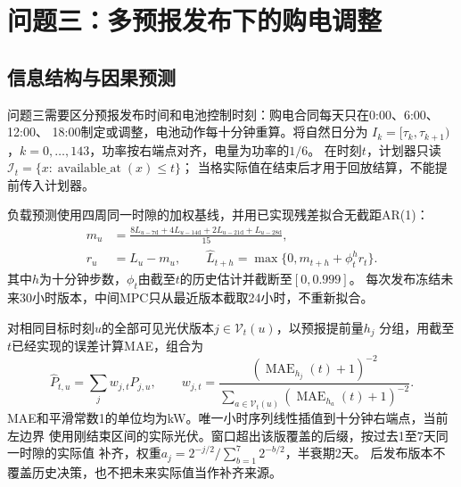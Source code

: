 \section{问题三：多预报发布下的购电调整}

\subsection{信息结构与因果预测}
问题三需要区分预报发布时间和电池控制时刻：购电合同每天只在0:00、6:00、12:00、
18:00制定或调整，电池动作每十分钟重算。将自然日分为
$I_k=[\tau_k,\tau_{k+1})$，$k=0,\ldots,143$，功率按右端点对齐，电量为功率的$1/6$。
在时刻$t$，计划器只读$\mathcal I_t=\{x:\operatorname{available\_at}(x)\le t\}$；
当格实际值在结束后才用于回放结算，不能提前传入计划器。

负载预测使用四周同一时隙的加权基线，并用已实现残差拟合无截距AR(1)：
\begin{align}
 m_u&=\frac{8L_{u-7\mathrm d}+4L_{u-14\mathrm d}+2L_{u-21\mathrm d}+L_{u-28\mathrm d}}{15},\\
 r_u&=L_u-m_u,\qquad
 \widehat L_{t+h}=\max\{0,m_{t+h}+\phi_t^h r_t\}.
\end{align}
其中$h$为十分钟步数，$\phi_t$由截至$t$的历史估计并截断至$[0,0.999]$。
每次发布冻结未来30小时版本，中间MPC只从最近版本截取24小时，不重新拟合。

对相同目标时刻$u$的全部可见光伏版本$j\in\mathcal V_t(u)$，以预报提前量$h_j$
分组，用截至$t$已经实现的误差计算MAE，组合为
\begin{equation}
 \widehat P_{t,u}=\sum_jw_{j,t}P_{j,u},\qquad
 w_{j,t}=\frac{(\operatorname{MAE}_{h_j}(t)+1)^{-2}}
 {\sum_{a\in\mathcal V_t(u)}(\operatorname{MAE}_{h_a}(t)+1)^{-2}}.
\end{equation}
MAE和平滑常数1的单位均为kW。唯一小时序列线性插值到十分钟右端点，当前左边界
使用刚结束区间的实际光伏。窗口超出该版覆盖的后缀，按过去1至7天同一时隙的实际值
补齐，权重$a_j=2^{-j/2}/\sum_{b=1}^7 2^{-b/2}$，半衰期2天。
后发布版本不覆盖历史决策，也不把未来实际值当作补齐来源。

